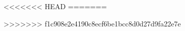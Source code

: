 \usepackage[longnamesfirst]{natbib}
\usepackage{listings}
\usepackage{graphicx}
\usepackage{float}
\usepackage{amsmath}
\usepackage{bm}
\usepackage[font=footnotesize]{caption}
\usepackage{subcaption}
\usepackage[margin=1.25in]{geometry}

\newcommand{\m}[1]{\mathbf{\bm{#1}}}
\newcommand{\R}{I\hspace{-4.4pt}R}

\setlength\parindent{0cm}
\usepackage{parskip}
\setlength{\parskip}{12pt}


\usepackage[compact]{titlesec}
<<<<<<< HEAD
=======

>>>>>>> f1c908e2e4190c8ecf6be1bcc8d0d27d9fa22e7e
